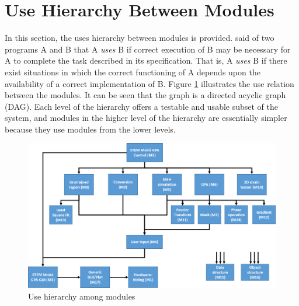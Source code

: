 \documentclass[12pt, titlepage]{article}
\begin{document}
\section{Use Hierarchy Between Modules} \label{SecUse}

In this section, the uses hierarchy between modules is
provided. \cite{Parnas1978} said of two programs A and B that A {\em uses} B if
correct execution of B may be necessary for A to complete the task described in
its specification. That is, A {\em uses} B if there exist situations in which
the correct functioning of A depends upon the availability of a correct
implementation of B.  Figure \ref{FigUH} illustrates the use relation between
the modules. It can be seen that the graph is a directed acyclic graph
(DAG). Each level of the hierarchy offers a testable and usable subset of the
system, and modules in the higher level of the hierarchy are essentially simpler
because they use modules from the lower levels.

\begin{figure}[H]
\centering
\includegraphics[width=\linewidth]{Figure_Hierarchy.png}
\caption{Use hierarchy among modules}
\label{FigUH}
\end{figure}




\end{document}

